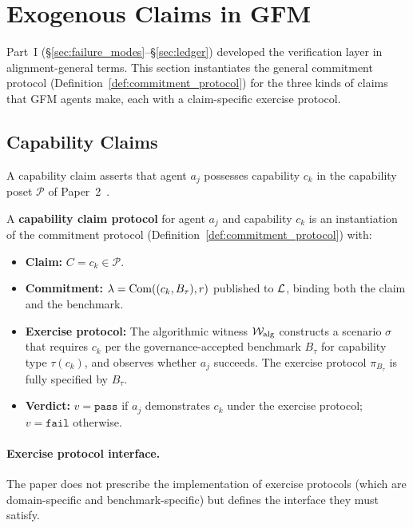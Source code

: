 \section{Exogenous Claims in GFM}
\label{sec:gfm_claims}

Part~I (\S\ref{sec:failure_modes}--\S\ref{sec:ledger}) developed the
verification layer in alignment-general terms.  This section instantiates
the general commitment protocol (Definition~\ref{def:commitment_protocol})
for the three kinds of claims that GFM agents make, each with a
claim-specific exercise protocol.

\subsection{Capability Claims}
\label{sec:capability_claims}

A capability claim asserts that agent $a_j$ possesses capability $c_k$
in the capability poset $\mathcal{P}$ of Paper~2~\citep{lasser2026poset}.

\begin{definition}
\label{def:cap_claim}
A \textbf{capability claim protocol} for agent $a_j$ and capability
$c_k$ is an instantiation of the commitment protocol
(Definition~\ref{def:commitment_protocol}) with:
\begin{itemize}
    \item \textbf{Claim:} $C = c_k \in \mathcal{P}$.
    \item \textbf{Commitment:} $\lambda = \mathrm{Com}((c_k, B_\tau), r)$
    published to $\mathcal{L}$, binding both the claim and the benchmark.
    \item \textbf{Exercise protocol:} The algorithmic witness
    $\mathcal{W}_{\mathrm{alg}}$ constructs a scenario $\sigma$ that
    requires $c_k$ per the governance-accepted benchmark $B_\tau$ for
    capability type $\tau(c_k)$, and observes whether $a_j$ succeeds.
    The exercise protocol $\pi_{B_\tau}$ is fully specified by $B_\tau$.
    \item \textbf{Verdict:} $v = \texttt{pass}$ if $a_j$ demonstrates
    $c_k$ under the exercise protocol; $v = \texttt{fail}$ otherwise.
\end{itemize}
\end{definition}

\paragraph{Exercise protocol interface.}
The paper does not prescribe the implementation of exercise protocols
(which are domain-specific and benchmark-specific) but defines the
interface they must satisfy.


